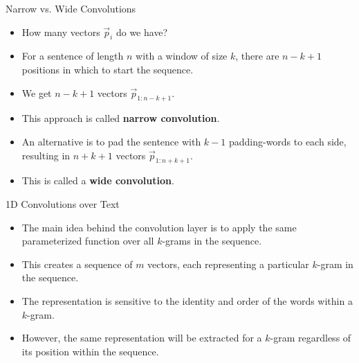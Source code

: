 \documentclass[handout]{beamer}
\begin{document}
\begin{frame}{Narrow vs. Wide Convolutions}
\begin{scriptsize}
\begin{itemize}
\item How many vectors $\vec{p}_i$ do we have?
\item For a sentence of length $n$ with a window of size $k$, there are $n - k + 1$ positions in which to start the sequence. 
\item We get $n - k + 1$ vectors $\vec{p}_{1:n-k+1}$. 
\item This approach is called \textbf{narrow convolution}.
\item An alternative is to pad the sentence with $k - 1$ padding-words to each side, resulting in $n+k+1$ vectors $\vec{p}_{1:n+k+1}$. 
\item This is called a \textbf{wide convolution}.
\end{itemize}
\end{scriptsize}
\end{frame}


\begin{frame}{1D Convolutions over Text}
\begin{scriptsize}
\begin{itemize}
\item The main idea behind the convolution layer is to apply the same parameterized function over all $k$-grams in the sequence.
\item This creates a sequence of $m$ vectors, each representing
a particular $k$-gram in the sequence.
\item The representation is sensitive to the identity and order of the words within a $k$-gram.
\item However, the same representation will be extracted for a $k$-gram regardless of its position within the sequence.
\end{itemize}
\end{scriptsize}
\end{frame}
\end{document}
